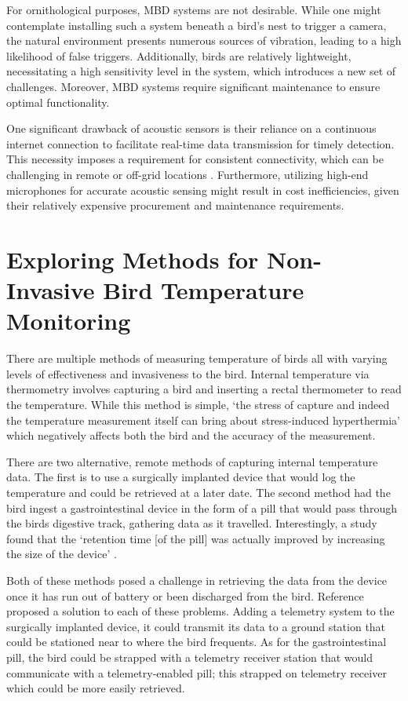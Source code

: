 \documentclass[class=report,11pt,crop=false]{standalone}
\begin{document}
For ornithological purposes, \acrshort{MBD} systems are not desirable. While one might contemplate installing such a system beneath a bird's nest to trigger a camera, the natural environment presents numerous sources of vibration, leading to a high likelihood of false triggers. Additionally, birds are relatively lightweight, necessitating a high sensitivity level in the system, which introduces a new set of challenges. Moreover, \acrshort{MBD} systems require significant maintenance to ensure optimal functionality.

One significant drawback of acoustic sensors is their reliance on a continuous internet connection to facilitate real-time data transmission for timely detection. This necessity imposes a requirement for consistent connectivity, which can be challenging in remote or off-grid locations \cite{AcousticSensing}. Furthermore, utilizing high-end microphones for accurate acoustic sensing might result in cost inefficiencies, given their relatively expensive procurement and maintenance requirements.

\newpage
\section{Exploring Methods for Non-Invasive Bird Temperature Monitoring}
There are multiple methods of measuring temperature of birds all with varying levels of effectiveness and invasiveness to the bird. Internal temperature via thermometry involves capturing a bird and inserting a rectal thermometer to read the temperature. While this method is simple, ‘the stress of capture and indeed the temperature measurement itself can bring about stress-induced hyperthermia’ \cite{TEMPMeasuringChallenges} which negatively affects both the bird and the accuracy of the measurement.

There are two alternative, remote methods of capturing internal temperature data. The first is to use a surgically implanted device that would log the temperature and could be retrieved at a later date. The second method had the bird ingest a gastrointestinal device in the form of a pill that would pass through the birds digestive track, gathering data as it travelled. Interestingly, a study found that the ‘retention time [of the pill] was actually improved by increasing the size of the device’ \cite{TEMPMeasuringChallenges}.

Both of these methods posed a challenge in retrieving the data from the device once it has run out of battery or been discharged from the bird. Reference \cite{TEMPMeasuringChallenges} proposed a solution to each of these problems. Adding a telemetry system to the surgically implanted device, it could transmit its data to a ground station that could be stationed near to where the bird frequents. As for the gastrointestinal pill, the bird could be strapped with a telemetry receiver station that would communicate with a  telemetry-enabled pill; this strapped on telemetry receiver which could be more easily retrieved.
\end{document}
